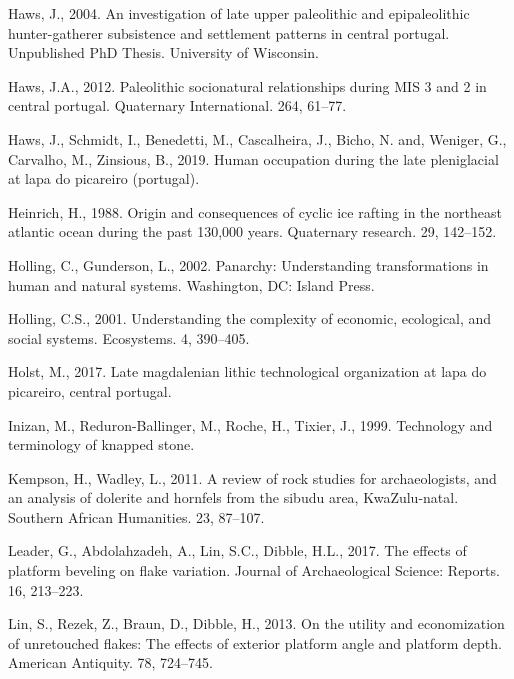 \documentclass[12pt,twoside]{reedthesis}
\begin{document}
\leavevmode\hypertarget{ref-haws2004}{}%
Haws, J., 2004. An investigation of late upper paleolithic and epipaleolithic hunter-gatherer subsistence and settlement patterns in central portugal. Unpublished PhD Thesis. University of Wisconsin.

\leavevmode\hypertarget{ref-haws2012}{}%
Haws, J.A., 2012. Paleolithic socionatural relationships during MIS 3 and 2 in central portugal. Quaternary International. 264, 61--77.

\leavevmode\hypertarget{ref-hawsetal2019}{}%
Haws, J., Schmidt, I., Benedetti, M., Cascalheira, J., Bicho, N. and, Weniger, G., Carvalho, M., Zinsious, B., 2019. Human occupation during the late pleniglacial at lapa do picareiro (portugal).

\leavevmode\hypertarget{ref-heinrich1988}{}%
Heinrich, H., 1988. Origin and consequences of cyclic ice rafting in the northeast atlantic ocean during the past 130,000 years. Quaternary research. 29, 142--152.

\leavevmode\hypertarget{ref-holling2002}{}%
Holling, C., Gunderson, L., 2002. Panarchy: Understanding transformations in human and natural systems. Washington, DC: Island Press.

\leavevmode\hypertarget{ref-holling2001}{}%
Holling, C.S., 2001. Understanding the complexity of economic, ecological, and social systems. Ecosystems. 4, 390--405.

\leavevmode\hypertarget{ref-holst2017}{}%
Holst, M., 2017. Late magdalenian lithic technological organization at lapa do picareiro, central portugal.

\leavevmode\hypertarget{ref-inizan1999}{}%
Inizan, M., Reduron-Ballinger, M., Roche, H., Tixier, J., 1999. Technology and terminology of knapped stone.

\leavevmode\hypertarget{ref-kempson2011}{}%
Kempson, H., Wadley, L., 2011. A review of rock studies for archaeologists, and an analysis of dolerite and hornfels from the sibudu area, KwaZulu-natal. Southern African Humanities. 23, 87--107.

\leavevmode\hypertarget{ref-leader2017}{}%
Leader, G., Abdolahzadeh, A., Lin, S.C., Dibble, H.L., 2017. The effects of platform beveling on flake variation. Journal of Archaeological Science: Reports. 16, 213--223.

\leavevmode\hypertarget{ref-linetal2013}{}%
Lin, S., Rezek, Z., Braun, D., Dibble, H., 2013. On the utility and economization of unretouched flakes: The effects of exterior platform angle and platform depth. American Antiquity. 78, 724--745.
\end{document}
